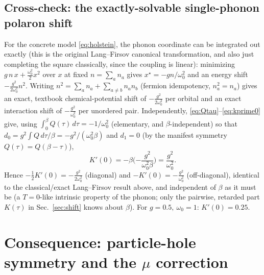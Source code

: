 \documentclass[a4paper,12pt]{article}
\renewcommand{\t}{\ensuremath{\tau}}
\newcommand{\w}{\ensuremath{\omega}}
\begin{document}
\subsection{Cross-check: the exactly-solvable single-phonon polaron shift}

For the concrete model \eqref{eq:holstein}, the phonon coordinate can be integrated
out exactly (this is the original Lang--Firsov canonical transformation, and also just
completing the square classically, since the coupling is linear): minimizing
$g\,n\,x+\tfrac{\w_0^2}{2}x^2$ over $x$ at fixed $n=\sum_a n_a$ gives
$x^\star=-gn/\w_0^2$ and an energy shift $-\tfrac{g^2}{2\w_0^2}n^2$. Writing
$n^2=\sum_a n_a + \sum_{a\neq b} n_an_b$ (fermion idempotency, $n_a^2=n_a$) gives an
exact, textbook chemical-potential shift of $-\tfrac{g^2}{2\w_0^2}$ per orbital and an
exact interaction shift of $-\tfrac{g^2}{\w_0^2}$ per unordered pair. Independently,
\eqref{eq:Qtau}--\eqref{eq:kprime0} give, using
$\int_0^\beta Q(\t)\,d\t = -1/\w_0^2$ (elementary, and $\beta$-independent) so that
$d_0 = g^2\!\int Q\,d\t/\beta = -g^2/(\w_0^2\beta)$ and $d_1=0$ (by the manifest
symmetry $Q(\t)=Q(\beta-\t)$),
\begin{equation}
  K'(0) = -\beta\Big({-\frac{g^2}{\w_0^2\beta}}\Big) = \frac{g^2}{\w_0^2}.
\end{equation}
Hence $-\tfrac12 K'(0) = -\tfrac{g^2}{2\w_0^2}$ (diagonal) and $-K'(0) =
-\tfrac{g^2}{\w_0^2}$ (off-diagonal),
identical to the classical/exact Lang--Firsov result above, and independent of
$\beta$ as it must be (a $T=0$-like intrinsic property of the phonon; only the
pairwise, retarded part $K(\t)$ in Sec.~\ref{sec:shift} knows about $\beta$). For
$g=0.5,\ \w_0=1$: $K'(0) = 0.25$.

\section{Consequence: particle-hole symmetry and the $\mu$ correction}
\label{sec:ph}
\end{document}
